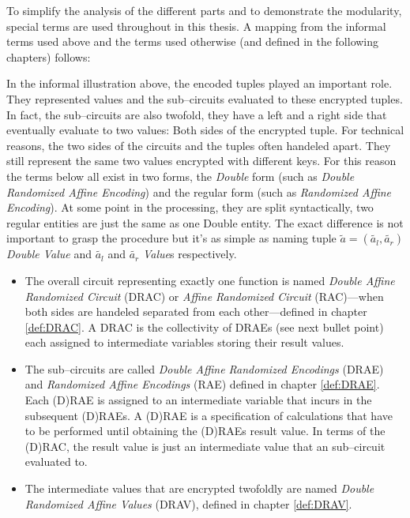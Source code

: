 To simplify the analysis of the different parts and to demonstrate the
modularity, special terms are used throughout in this thesis. A mapping from the
informal terms used above and the terms used otherwise (and defined in the
following chapters) follows:

In the informal illustration above, the encoded tuples played an important role.
They represented values and the sub--circuits evaluated to these encrypted
tuples. In fact, the sub--circuits are also twofold, they have a left and a
right side that eventually evaluate to two values: Both sides of the encrypted
tuple. For technical reasons, the two sides of the circuits and the tuples often
handeled apart. They still represent the same two values encrypted with
different keys. For this reason the terms below all exist in two forms, the
\emph{Double} form (such as \emph{Double Randomized Affine Encoding}) and the
regular form (such as \emph{Randomized Affine Encoding}). At some point in the
processing, they are split syntactically, two regular entities are just the same
as one Double entity. The exact difference is not important to grasp the
procedure but it's as simple as naming tuple $\widetilde{a} = (\widetilde{a_l},
\widetilde{a_r})$ \emph{Double Value} and $\widetilde{a_l}$ and
$\widetilde{a_r}$ \emph{Value}s respectively.

\begin{itemize}

  \item The overall circuit representing exactly one function is named
    \emph{Double Affine Randomized Circuit} (DRAC) or \emph{Affine Randomized
    Circuit} (RAC)---when both sides are handeled separated from each
    other---defined in chapter \ref{def:DRAC}. A DRAC is the collectivity of
    DRAEs (see next bullet point) each assigned to intermediate variables
    storing their result values.

  \item The sub--circuits are called \emph{Double Affine Randomized Encodings}
    (DRAE) and \emph{Randomized Affine Encodings} (RAE) defined in chapter
    \ref{def:DRAE}. Each (D)RAE is assigned to an intermediate variable that
    incurs in the subsequent (D)RAEs. A (D)RAE is a specification of
    calculations that have to be performed until obtaining the (D)RAEs result
    value. In terms of the (D)RAC, the result value is just an intermediate
    value that an sub--circuit evaluated to.

  \item The intermediate values that are encrypted twofoldly are named
    \emph{Double Randomized Affine Values} (DRAV), defined in chapter
    \ref{def:DRAV}.

\end{itemize}


